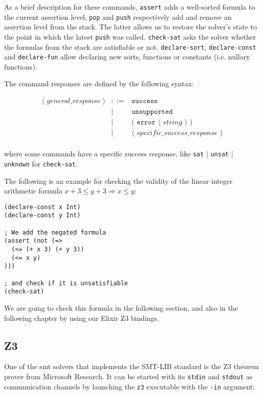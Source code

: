 As a brief description for these commands, \verb|assert| adds a well-sorted
formula to the current assertion level, \verb|pop| and \verb|push| respectively
add and remove an assertion level from the stack. The latter allows us to
restore the solver's state to the point in which the latest \verb|push| was
called.  \verb|check-sat| asks the solver whether the formulas from the stack
are satisfiable or not.  \verb|declare-sort|, \verb|declare-const| and
\verb|declare-fun| allow declaring new sorts, functions or constants (i.e.
nullary functions).

The command responses are defined by the following syntax:

\[
\begin{array}{rcll}
\langle\textit{ general\_response }\rangle & ::= & \texttt{success}\\
& | & \texttt{unsupported}\\
& | & \texttt{( error } \langle\textit{ string }\rangle \texttt{ ) }\\
& | & \langle\textit{ specific\_success\_response }\rangle\\
\end{array}
\]

where some commands have a specific success response, like \verb|sat| |
\verb|unsat| | \verb|unknown| for \verb|check-sat|.

The following is an example for checking the validity of the linear integer 
arithmetic formula $x + 3 \leq y + 3 \Rightarrow x \leq y$:

\begin{verbatim}
(declare-const x Int)
(declare-const y Int)

; We add the negated formula
(assert (not (=> 
  (<= (+ x 3) (+ y 3)) 
  (<= x y)
)))

; and check if it is unsatisfiable
(check-sat)
\end{verbatim}

We are going to check this formula in the following section, and also in the 
following chapter by using our Elixir Z3 bindings.

\subsection{Z3}

One of the \acrshort{smt} solvers that implements the SMT-LIB standard is the Z3
theorem prover from Microsoft Research. It can be started with its \verb|stdin|
and \verb|stdout| as communication channels by launching the \verb|z3|
executable with the \verb|-in| argument:

